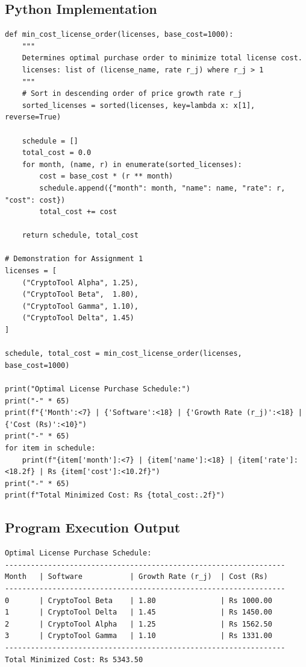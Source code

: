 \documentclass[12pt]{article}
\begin{document}
\subsection*{Python Implementation}
\begin{lstlisting}[style=code]
def min_cost_license_order(licenses, base_cost=1000):
    """
    Determines optimal purchase order to minimize total license cost.
    licenses: list of (license_name, rate r_j) where r_j > 1
    """
    # Sort in descending order of price growth rate r_j
    sorted_licenses = sorted(licenses, key=lambda x: x[1], reverse=True)
    
    schedule = []
    total_cost = 0.0
    for month, (name, r) in enumerate(sorted_licenses):
        cost = base_cost * (r ** month)
        schedule.append({"month": month, "name": name, "rate": r, "cost": cost})
        total_cost += cost
        
    return schedule, total_cost

# Demonstration for Assignment 1
licenses = [
    ("CryptoTool Alpha", 1.25),
    ("CryptoTool Beta",  1.80),
    ("CryptoTool Gamma", 1.10),
    ("CryptoTool Delta", 1.45)
]

schedule, total_cost = min_cost_license_order(licenses, base_cost=1000)

print("Optimal License Purchase Schedule:")
print("-" * 65)
print(f"{'Month':<7} | {'Software':<18} | {'Growth Rate (r_j)':<18} | {'Cost (Rs)':<10}")
print("-" * 65)
for item in schedule:
    print(f"{item['month']:<7} | {item['name']:<18} | {item['rate']:<18.2f} | Rs {item['cost']:<10.2f}")
print("-" * 65)
print(f"Total Minimized Cost: Rs {total_cost:.2f}")
\end{lstlisting}

\subsection*{Program Execution Output}
\begin{lstlisting}[style=output]
Optimal License Purchase Schedule:
-----------------------------------------------------------------
Month   | Software           | Growth Rate (r_j)  | Cost (Rs) 
-----------------------------------------------------------------
0       | CryptoTool Beta    | 1.80               | Rs 1000.00   
1       | CryptoTool Delta   | 1.45               | Rs 1450.00   
2       | CryptoTool Alpha   | 1.25               | Rs 1562.50   
3       | CryptoTool Gamma   | 1.10               | Rs 1331.00   
-----------------------------------------------------------------
Total Minimized Cost: Rs 5343.50
\end{lstlisting}
\end{document}
